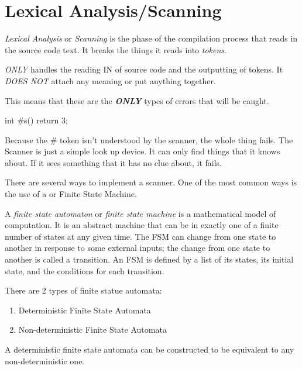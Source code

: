 \section{Lexical Analysis/Scanning}\label{sec:Lexical Analysis}
\begin{definition}\label{def:Lexical Analysis}
  \emph{Lexical Analysis} or \emph{Scanning} is the phase of the compilation process that reads in the source code text.
  It breaks the things it reads into \emph{tokens}.
  \begin{remark}
     \emph{ONLY} handles the reading IN of source code and the outputting of tokens.
    It \emph{DOES NOT} attach any meaning or put anything together.
  \end{remark}

  This means that these are the \textbf{\emph{ONLY}} types of errors that will be caught.
  \begin{javasource}
    int #s() {
      return 3;
    }
  \end{javasource}

  Because the \# token isn't understood by the scanner, the whole thing fails.
  The Scanner is just a simple look up device. It can only find things that it knows about.
  If it sees something that it has no clue about, it fails.
\end{definition}

There are several ways to implement a scanner.
One of the most common ways is the use of a  or Finite State Machine.

\begin{definition}\label{def:Finite State Automaton}
  A \emph{finite state automaton} or \emph{finite state machine} is a mathematical model of computation.
  It is an abstract machine that can be in exactly one of a finite number of states at any given time.
  The FSM can change from one state to another in response to some external inputs; the change from one state to another is called a transition.
  An FSM is defined by a list of its states, its initial state, and the conditions for each transition.

  There are 2 types of finite statue automata:
  \begin{enumerate}
  \item Deterministic Finite State Automata
  \item Non-deterministic Finite State Automata
  \end{enumerate}

  A deterministic finite state automata can be constructed to be equivalent to any non-deterministic one.
\end{definition}
